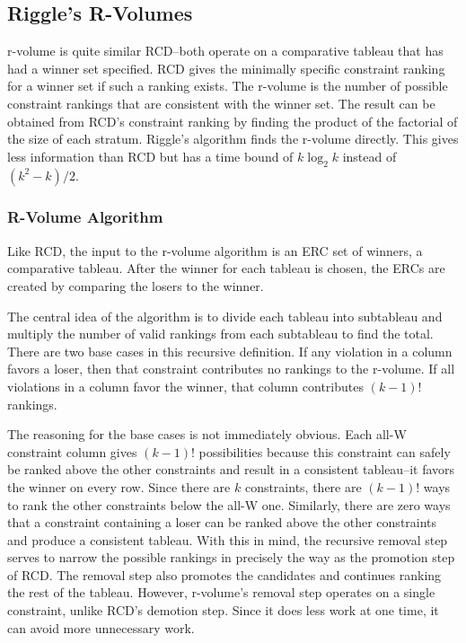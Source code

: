 \documentclass[11pt]{article}
\begin{document}
\subsection{Riggle's R-Volumes}

 r-volume is quite similar RCD--both operate on a comparative tableau
that has had a winner set specified. RCD gives the minimally specific
constraint ranking for a winner set if such a ranking exists. The
r-volume is the number of possible constraint rankings that are
consistent with the winner set. The result can be obtained from RCD's
constraint ranking by finding the product of the factorial of the size
of each stratum. Riggle's algorithm finds the r-volume directly. This
gives less information than RCD but has a time bound of $k \log_2 k$
instead of $(k^2 - k) / 2$.

\subsubsection{R-Volume Algorithm}
\label{r-volume}

Like RCD, the input to the r-volume algorithm is an ERC set of
winners, a comparative tableau. After the winner for each tableau is
chosen, the ERCs are created by comparing the losers to the winner.

The central idea of the algorithm is to divide each tableau into subtableau
 and multiply the number of valid rankings from each
subtableau to find the total. There are two base cases in this recursive definition. If
any violation in a column favors a loser, then that constraint
contributes no rankings to the r-volume. If all violations in a column
favor the winner, that column contributes $(k-1)!$ rankings.

The reasoning for the base cases is not immediately obvious.  Each
all-W constraint column gives $(k-1)!$ possibilities because this
constraint can safely be ranked above the other constraints and result
in a consistent tableau--it favors the winner on every row. Since there
are $k$ constraints, there are $(k-1)!$ ways to rank the other
constraints below the all-W one.  Similarly, there are zero ways
that a constraint containing a loser can be ranked above the other
constraints and produce a consistent tableau. With this in mind, the
recursive removal step serves to narrow the possible rankings in
precisely the way as the promotion step of RCD. The removal step also
promotes the candidates and continues ranking the rest of the
tableau. However, r-volume's removal step operates on a single
constraint, unlike RCD's demotion step. Since it does less work at one
time, it can avoid more unnecessary work.
\end{document}
